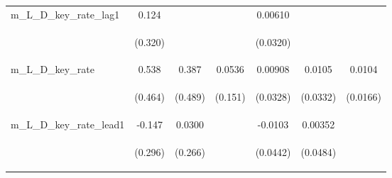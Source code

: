 \documentclass[]{article}
\begin{document}
\begin{center}
\begin{tabular}{lcccccc}
m\_L\_D\_key\_rate\_lag1 & 0.124 &  &  & 0.00610 &  &  \\
\vspace{4pt} & \begin{footnotesize}(0.320)\end{footnotesize} & \begin{footnotesize}\end{footnotesize} & \begin{footnotesize}\end{footnotesize} & \begin{footnotesize}(0.0320)\end{footnotesize} & \begin{footnotesize}\end{footnotesize} & \begin{footnotesize}\end{footnotesize} \\
m\_L\_D\_key\_rate & 0.538 & 0.387 & 0.0536 & 0.00908 & 0.0105 & 0.0104 \\
\vspace{4pt} & \begin{footnotesize}(0.464)\end{footnotesize} & \begin{footnotesize}(0.489)\end{footnotesize} & \begin{footnotesize}(0.151)\end{footnotesize} & \begin{footnotesize}(0.0328)\end{footnotesize} & \begin{footnotesize}(0.0332)\end{footnotesize} & \begin{footnotesize}(0.0166)\end{footnotesize} \\
m\_L\_D\_key\_rate\_lead1 & -0.147 & 0.0300 &  & -0.0103 & 0.00352 &  \\
\vspace{4pt} & \begin{footnotesize}(0.296)\end{footnotesize} & \begin{footnotesize}(0.266)\end{footnotesize} & \begin{footnotesize}\end{footnotesize} & \begin{footnotesize}(0.0442)\end{footnotesize} & \begin{footnotesize}(0.0484)\end{footnotesize} & \begin{footnotesize}\end{footnotesize} \\

\end{tabular}
\end{center}
\end{document}
